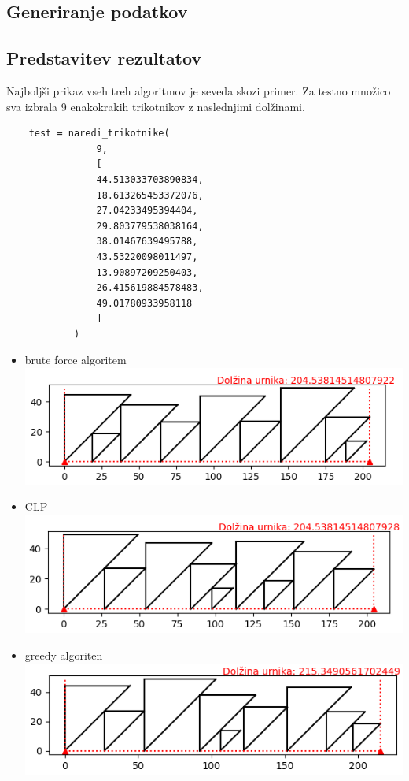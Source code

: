 \documentclass[a4paper,12pt]{article}
\theoremstyle{definition}
\theoremstyle{plain}
\begin{document}
\subsection{Generiranje podatkov}

\subsection{Predstavitev rezultatov}
Najboljši prikaz vseh treh algoritmov je seveda skozi primer.
Za testno množico sva izbrala 9 enakokrakih trikotnikov z naslednjimi dolžinami.
\begin{verbatim}
    test = naredi_trikotnike(
                9,
                [ 
                44.513033703890834,
                18.613265453372076,
                27.04233495394404,
                29.803779538038164,
                38.01467639495788,
                43.53220098011497,
                13.90897209250403,
                26.415619884578483,
                49.01780933958118
                ]
            )
\end{verbatim}

\begin{itemize}
    \item brute force algoritem \\ \includegraphics[]{sim_brut.png}
    \item CLP \\ \includegraphics[]{sim_clp.png}
    \item greedy algoriten \\ \includegraphics[]{sim_greedy.png}
\end{itemize}
\end{document}
